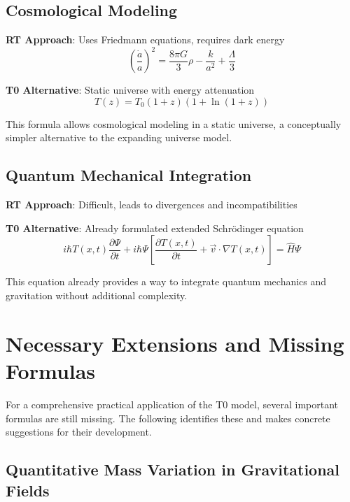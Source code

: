 \documentclass[12pt,a4paper]{article}
\newcommand{\Tfieldt}{T(x,t)}
\begin{document}
	\subsection{Cosmological Modeling}
	\label{subsec:cosmological_modeling}
	
	\textbf{RT Approach}: Uses Friedmann equations, requires dark energy
	\begin{equation}
		\left(\frac{\dot{a}}{a}\right)^2 = \frac{8\pi G}{3}\rho - \frac{k}{a^2} + \frac{\Lambda}{3}
	\end{equation}
	
	\textbf{T0 Alternative}: Static universe with energy attenuation
	\begin{equation}
		T(z) = T_0 (1+z)(1+\ln(1+z))
	\end{equation}
	
	This formula allows cosmological modeling in a static universe, a conceptually simpler alternative to the expanding universe model.
	
	\subsection{Quantum Mechanical Integration}
	\label{subsec:quantum_integration}
	
	\textbf{RT Approach}: Difficult, leads to divergences and incompatibilities
	
	\textbf{T0 Alternative}: Already formulated extended Schrödinger equation
	\begin{equation}
		i\hbar \Tfieldt \frac{\partial\Psi}{\partial t} + i\hbar \Psi \left[\frac{\partial \Tfieldt}{\partial t} + \vec{v}\cdot\nabla\Tfieldt\right] = \hat{H} \Psi
	\end{equation}
	
	This equation already provides a way to integrate quantum mechanics and gravitation without additional complexity.
	
	\section{Necessary Extensions and Missing Formulas}
	\label{sec:missing_formulas}
	
	For a comprehensive practical application of the T0 model, several important formulas are still missing. The following identifies these and makes concrete suggestions for their development.
	
	\subsection{Quantitative Mass Variation in Gravitational Fields}
	\label{subsec:mass_variation}
	
\end{document}
